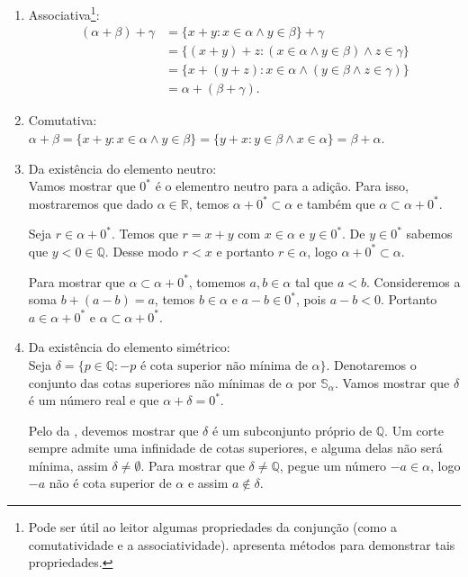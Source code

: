 \documentclass[../main.tex]{subfiles}
\begin{document}
\begin{dem}
\begin{enumerate}[label=(\roman*)]
        \item Associativa\footnote{Pode ser útil ao leitor algumas propriedades da conjunção (como a comutatividade e a associatividade). \Textcite[p. 147]{mortari} apresenta métodos para demonstrar tais propriedades.}:
            \begin{align*}
                (\alpha+\beta)+\gamma &= \{ x+y: x \in \alpha \land y \in \beta \} + \gamma  \\
                &= \{ (x+y)+z : (x \in \alpha \land y \in \beta) \land z \in \gamma \} \\
                &= \{ x+(y+z) : x \in \alpha \land (y \in \beta \land z \in \gamma) \} \\
                &= \alpha + (\beta + \gamma).
            \end{align*}
            
        \item Comutativa: \\
            $\alpha + \beta = \{ x+y : x \in \alpha \land y \in \beta \} = \{ y+x: y \in \beta \land x \in \alpha \} = \beta + \alpha$.
            
        \item Da existência do elemento neutro: \\
            Vamos mostrar que $0^*$ é o elementro neutro para a adição. Para isso, mostraremos que dado $\alpha \in \mathbb{R}$, temos $\alpha + 0^* \subset \alpha$ e também que $\alpha \subset \alpha + 0^*$.

            Seja $r \in \alpha + 0^*$. Temos que $r = x+y$ com $x \in \alpha$ e $y \in 0^*$. De $y \in 0^*$ sabemos que $y < 0 \in \mathbb{Q}$. Desse modo $r < x$ e portanto $r \in \alpha$, logo $\alpha + 0^* \subset \alpha$.

            Para mostrar que $\alpha \subset \alpha + 0^*$, tomemos $a, b \in \alpha$ tal que $a < b$. Consideremos a soma $b + (a - b) = a$, temos $b \in \alpha$ e $a-b \in 0^*$, pois $a-b < 0$. Portanto $a \in \alpha + 0^*$ e $\alpha \subset \alpha + 0^*$.
        \item Da existência do elemento simétrico: \\
            Seja $\delta = \{ p \in \mathbb{Q} : -p \text{ é cota superior não mínima de } \alpha \}$. Denotaremos o conjunto das cotas superiores não mínimas de $\alpha$ por $\mathbb{S}_{\alpha}$.
            Vamos mostrar que $\delta$ é um número real e que $\alpha + \delta = 0^*$.

            Pelo  da , devemos mostrar que $\delta$ é um subconjunto próprio de $\mathbb{Q}$. Um corte sempre admite uma infinidade de cotas superiores, e alguma delas não será mínima, assim $\delta \neq \emptyset$. Para mostrar que $\delta \neq \mathbb{Q}$, pegue um número $-a \in \alpha$, logo $-a$ não é cota superior de $\alpha$ e assim $a \not\in \delta$.


\end{enumerate}
\end{dem}
\end{document}
